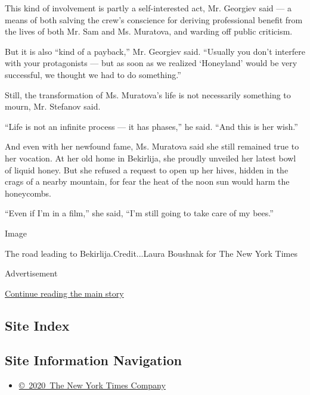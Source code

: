 This kind of involvement is partly a self-interested act, Mr. Georgiev
said --- a means of both salving the crew's conscience for deriving
professional benefit from the lives of both Mr. Sam and Ms. Muratova,
and warding off public criticism.

But it is also ``kind of a payback,'' Mr. Georgiev said. ``Usually you
don't interfere with your protagonists --- but as soon as we realized
`Honeyland' would be very successful, we thought we had to do
something.''

Still, the transformation of Ms. Muratova's life is not necessarily
something to mourn, Mr. Stefanov said.

``Life is not an infinite process --- it has phases,'' he said. ``And
this is her wish.''

And even with her newfound fame, Ms. Muratova said she still remained
true to her vocation. At her old home in Bekirlija, she proudly unveiled
her latest bowl of liquid honey. But she refused a request to open up
her hives, hidden in the crags of a nearby mountain, for fear the heat
of the noon sun would harm the honeycombs.

``Even if I'm in a film,'' she said, ``I'm still going to take care of
my bees.''

Image

The road leading to Bekirlija.Credit...Laura Boushnak for The New York
Times

Advertisement

\protect\hyperlink{after-bottom}{Continue reading the main story}

\hypertarget{site-index}{%
\subsection{Site Index}\label{site-index}}

\hypertarget{site-information-navigation}{%
\subsection{Site Information
Navigation}\label{site-information-navigation}}

\begin{itemize}
\tightlist
\item
  \href{https://help.nytimes3xbfgragh.onion/hc/en-us/articles/115014792127-Copyright-notice}{©~2020~The
  New York Times Company}
\end{itemize}

